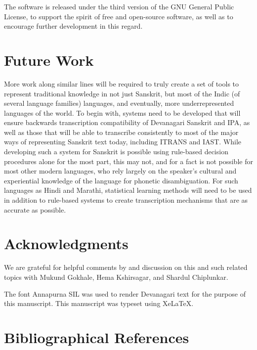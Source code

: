 \documentclass[10pt,a4paper]{article}
\begin{document}
The software is released under the third version of the GNU General Public License, to support the spirit of free and open-source software, as well as to encourage further development in this regard.

\section{Future Work}
More work along similar lines will be required to truly create a set of tools to represent traditional knowledge in not just Sanskrit, but most of the Indic (of several language families) languages, and eventually, more underrepresented languages of the world. To begin with, systems need to be developed that will ensure backwards transcription compatibility of Devanagari Sanskrit and IPA, as well as those that will be able to transcribe consistently to most of the major ways of representing Sanskrit text today, including ITRANS and IAST.
While developing such a system for Sanskrit is possible using rule-based decision procedures alone for the most part, this may not, and for a fact is not possible for most other modern languages, who rely largely on the speaker's cultural and experiential knowledge of the language for phonetic disambiguation. For such languages as Hindi and Marathi, statistical learning methods will need to be used in addition to rule-based systems to create transcription mechanisms that are as accurate as possible.

\section{Acknowledgments}
We are grateful for helpful comments by and discussion on this and such related topics with Mukund Gokhale, Hema Kshirsagar, and Shardul Chiplunkar.

The font Annapurna SIL was used to render Devanagari text for the purpose of this manuscript.
This manuscript was typeset using Xe\LaTeX.

\section{Bibliographical References}
\label{main:ref}





	
\end{document}
